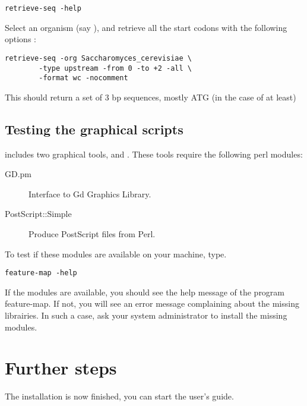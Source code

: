 \documentclass{article}
\begin{document}
\begin{verbatim}
retrieve-seq -help
\end{verbatim}

Select an organism (say ), and
retrieve all the start codons with the following options :

\begin{verbatim}
retrieve-seq -org Saccharomyces_cerevisiae \
        -type upstream -from 0 -to +2 -all \
        -format wc -nocomment 
\end{verbatim}

This should return a set of 3 bp sequences, mostly ATG (in the case of
 at least)

\subsection{Testing the graphical scripts}

\RSAT includes two graphical tools,  and
. These tools require the following  perl modules: 

\begin{description}
\item[GD.pm] Interface to Gd Graphics Library.
\item[PostScript::Simple]  Produce PostScript files from Perl.
\end{description}

To test if these modules are available on your machine, type.

\begin{verbatim}
feature-map -help
\end{verbatim}

If the modules are available, you should see the help message of the
program feature-map. If not, you will see an error message complaining
about the missing librairies. In such a case, ask your system
administrator to install the missing modules.

\section{Further steps}

The installation is now finished, you can start the user's guide. 
\end{document}
